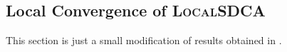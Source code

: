 \documentclass{article} %
\newcommand{\localSDCA}{\textsc{LocalSDCA}\xspace}
\begin{document}
%
%
  
 





\subsection{Local Convergence of \localSDCA}
This section is just a small modification of results
obtained in \cite{ShalevShwartz:2013wl}.
\end{document}

